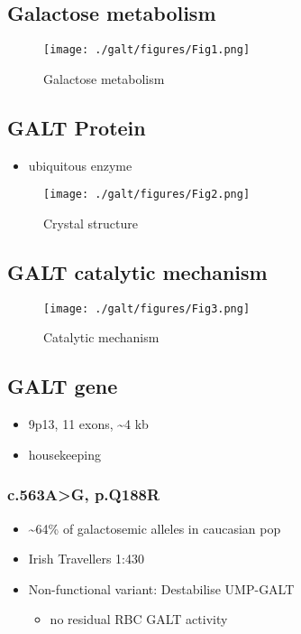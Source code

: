 \documentclass{scrartcl}
\begin{document}
\subsection{Galactose metabolism}
\label{sec:org1574889}

\begin{figure}[htbp]
\centering
\texttt{[image: ./galt/figures/Fig1.png]}
\caption[met]{\label{fig:orga70790f}
Galactose metabolism}
\end{figure}


\subsection{GALT Protein}
\label{sec:orgde8a7ca}
\begin{itemize}
\item ubiquitous enzyme
\end{itemize}

\begin{figure}[htbp]
\centering
\texttt{[image: ./galt/figures/Fig2.png]}
\caption[structure]{\label{fig:orgd2c545e}
Crystal structure}
\end{figure}


\subsection{GALT catalytic mechanism}
\label{sec:org18635eb}

\begin{figure}[htbp]
\centering
\texttt{[image: ./galt/figures/Fig3.png]}
\caption[mechanism]{\label{fig:orgcc755d0}
Catalytic mechanism}
\end{figure}


\subsection{GALT gene}
\label{sec:orgdff780b}
\begin{itemize}
\item 9p13, 11 exons, \textasciitilde{}4 kb
\item housekeeping
\end{itemize}
\subsubsection{c.563A>G, p.Q188R}
\label{sec:org18cedbb}
\begin{itemize}
\item \textasciitilde{}64\% of galactosemic alleles in caucasian pop
\item Irish Travellers 1:430
\item Non-functional variant: Destabilise UMP-GALT
\begin{itemize}
\item no residual RBC GALT activity
\end{itemize}
\end{itemize}
\end{document}
